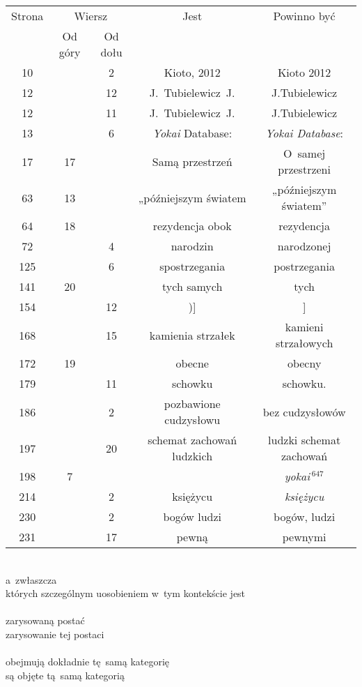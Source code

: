 \documentclass[a4paper,11pt]{article}
\numberwithin{equation}{section}
\begin{document}
\begin{center}

  \begin{tabular}{|c|c|c|c|c|}
    \hline
    Strona & \multicolumn{2}{c|}{Wiersz} & Jest
                              & Powinno być \\ \cline{2-3}
    & Od góry & Od dołu & & \\
    \hline
    10  & &  2 & Kioto, 2012 & Kioto 2012 \\
    12  & & 12 & J.~Tubielewicz~J. & J.Tubielewicz \\
    12  & & 11 & J.~Tubielewicz~J. & J.Tubielewicz \\
    13  & &  6 & \textit{Yokai} Database: & \textit{Yokai Database}: \\
    17  & 17 & & Samą przestrzeń & O~samej przestrzeni \\
    63  & 13 & & „późniejszym światem & „późniejszym światem” \\
    64  & 18 & & rezydencja obok & rezydencja \\
    72  & &  4 & narodzin & narodzonej \\
    125 & &  6 & spostrzegania & postrzegania \\
    141 & 20 & & tych samych & tych \\
    154 & & 12 & )] & ] \\
    168 & & 15 & kamienia strzałek & kamieni strzałowych \\
    172 & 19 & & obecne & obecny \\
    179 & & 11 & schowku & schowku. \\
    186 & &  2 & pozbawione cudzysłowu & bez cudzysłowów \\
    197 & & 20 & schemat zachowań ludzkich & ludzki schemat zachowań \\
    198 &  7 & & & \textit{yokai$\,^{647}$} \\  %
    214 & &  2 & księżycu & \textit{księżycu} \\
    230 & &  2 & bogów ludzi & bogów, ludzi \\
    231 & & 17 & pewną & pewnymi \\
    \hline
  \end{tabular}

\end{center}

\VerSpaceTwo


\noindent
{} \\
\Jest a~zwłaszcza \\
\PowinnoByc których szczególnym uosobieniem w~tym kontekście jest \\
 \\
\Jest zarysowaną postać \\
\PowinnoByc zarysowanie tej postaci \\
 \\
\Jest obejmują dokładnie tę~samą kategorię \\
\PowinnoByc są objęte tą~samą kategorią \\
\end{document}
